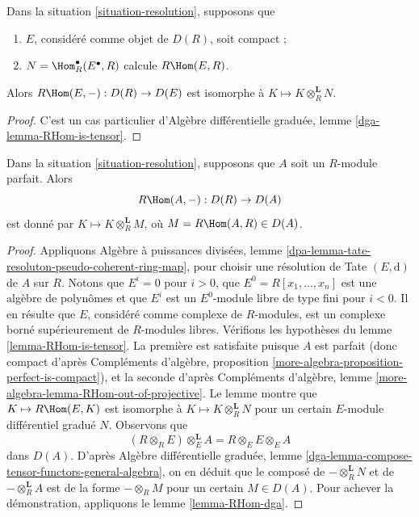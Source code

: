 \begin{lemma}
\label{lemma-RHom-is-tensor}
Dans la situation \ref{situation-resolution}, supposons que
\begin{enumerate}
\item $E$, considéré comme objet de $D(R)$, soit compact ;
\item $N = \Hom^\bullet_R(E^\bullet, R)$ calcule $R\Hom(E, R)$.
\end{enumerate}
Alors $R\Hom(E, -) : D(R) \to D(E)$ est isomorphe à
$K \mapsto K \otimes_R^\mathbf{L} N$.
\end{lemma}

\begin{proof}
C'est un cas particulier d'Algèbre différentielle graduée, lemme \ref{dga-lemma-RHom-is-tensor}.
\end{proof}

\begin{lemma}
\label{lemma-RHom-is-tensor-special}
Dans la situation \ref{situation-resolution}, supposons que $A$ soit un $R$-module parfait.
Alors
$$
R\Hom(A, -) : D(R) \to D(A)
$$
est donné par $K \mapsto K \otimes_R^\mathbf{L} M$,
où $M = R\Hom(A, R) \in D(A)$.
\end{lemma}

\begin{proof}
Appliquons Algèbre à puissances divisées, lemme \ref{dpa-lemma-tate-resoluton-pseudo-coherent-ring-map},
pour choisir une résolution de Tate $(E, \text{d})$ de $A$ sur $R$.
Notons que $E^i = 0$ pour $i > 0$, que $E^0 = R[x_1, \ldots, x_n]$ est une algèbre de polynômes
et que $E^i$ est un $E^0$-module libre de type fini pour $i < 0$.
Il en résulte que $E$, considéré comme complexe de $R$-modules,
est un complexe borné supérieurement de $R$-modules libres.
Vérifions les hypothèses du lemme \ref{lemma-RHom-is-tensor}.
La première est satisfaite puisque $A$ est parfait
(donc compact d'après Compléments d'algèbre, proposition \ref{more-algebra-proposition-perfect-is-compact}),
et la seconde d'après Compléments d'algèbre, lemme \ref{more-algebra-lemma-RHom-out-of-projective}.
Le lemme montre que $K \mapsto R\Hom(E, K)$ est isomorphe à $K \mapsto K \otimes_R^\mathbf{L} N$
pour un certain $E$-module différentiel gradué $N$.
Observons que
$$
(R \otimes_R E) \otimes_E^\mathbf{L} A = R \otimes_E E \otimes_E A
$$
dans $D(A)$. D'après Algèbre différentielle graduée, lemme \ref{dga-lemma-compose-tensor-functors-general-algebra},
on en déduit que le composé de $- \otimes_R^\mathbf{L} N$ et de $- \otimes_R^\mathbf{L} A$
est de la forme $- \otimes_R M$ pour un certain $M \in D(A)$.
Pour achever la démonstration, appliquons le lemme \ref{lemma-RHom-dga}.
\end{proof}

